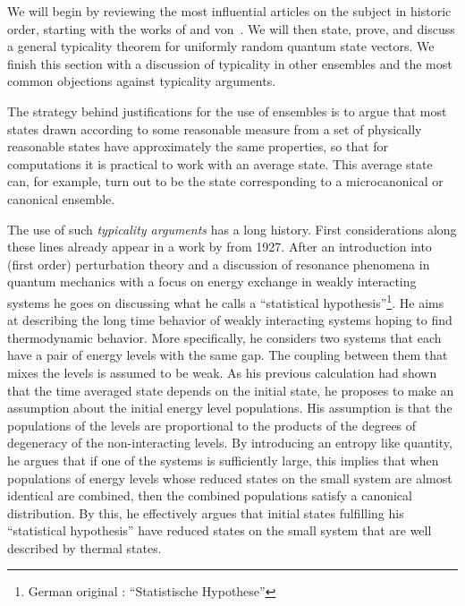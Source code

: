 \documentclass[a4paper,12pt,listof=totoc,index=totoc,bibliography=totoc,headsepline=false,headings=normal,BCOR16.153846mm,DIV12,headinclude,twoside,cleardoublepage=empty,numbers=noenddot,final]{scrreprt}
\theoremstyle{mystyle}
\numberwithin{equation}{section}
\numberwithin{figure}{section}
\numberwithin{lemma}{section}
\numberwithin{theorem}{section}
\numberwithin{corollary}{section}
\numberwithin{definition}{section}
\numberwithin{conjecture}{section}
\numberwithin{observation}{section}
\newcommand{\+}{\mkern2mu}
\DeclareMathOperator{\1}{\mathds{1}}
\begin{document}
We will begin by reviewing the most influential articles on the subject in historic order, starting with the works of \textcite{Schroedinger1927} and von~\textcite{vonneumann1929}.
We will then state, prove, and discuss a general typicality theorem for uniformly random quantum state vectors.
We finish this section with a discussion of typicality in other ensembles and the most common objections against typicality arguments.

The strategy behind justifications for the use of ensembles is to argue that most states drawn according to some reasonable measure from a set of physically reasonable states have approximately the same properties, so that for computations it is practical to work with an average state.
This average state can, for example, turn out to be the state corresponding to a microcanonical or canonical ensemble.

The use of such \emph{typicality arguments} has a long history.
First considerations along these lines already appear in a work by \textcite{Schroedinger1927} from 1927.
After an introduction into (first order) perturbation theory and a discussion of resonance phenomena in quantum mechanics with a focus on energy exchange in weakly interacting systems he goes on discussing what he calls a ``statistical hypothesis''\footnote{German original \cite{Schroedinger1927}: \foreignlanguage{ngerman}{``Statistische Hypothese''}}. 
He aims at describing the long time behavior of weakly interacting systems hoping to find thermodynamic behavior.
More specifically, he considers two systems that each have a pair of energy levels with the same gap.
The coupling between them that mixes the levels is assumed to be weak.
As his previous calculation had shown that the time averaged state depends on the initial state, he proposes to make an assumption about the initial energy level populations.
His assumption is that the populations of the levels are proportional to the products of the degrees of degeneracy of the non-interacting levels.
By introducing an entropy like quantity, he argues that if one of the systems is sufficiently large, this implies that when populations of energy levels whose reduced states on the small system are almost identical are combined, then the combined populations satisfy a canonical distribution.
By this, he effectively argues that initial states fulfilling his ``statistical hypothesis'' have reduced states on the small system that are well described by thermal states.
\end{document}
